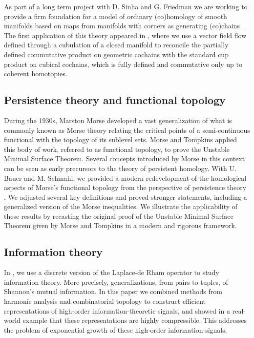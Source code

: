 As part of a long term project with D. Sinha and G. Friedman we are working to provide a firm foundation for a model of ordinary (co)homology of smooth manifolds based on maps from manifolds with corners as generating (co)chains \cite{medina2021foundations}.
The first application of this theory appeared in \cite{medina2021flowing}, where we use a vector field flow defined through a cubulation of a closed manifold to reconcile the partially defined commutative product on geometric cochains with the standard cup product on cubical cochains, which is fully defined and commutative only up to coherent homotopies.

\subsection{Persistence theory and functional topology}

During the 1930s, Marston Morse developed a vast generalization of what is commonly known as Morse theory relating the critical points of a semi-continuous functional with the topology of its sublevel sets.
Morse and Tompkins applied this body of work, referred to as functional topology, to prove the Unstable Minimal Surface Theorem.
Several concepts introduced by Morse in this context can be seen as early precursors to the theory of persistent homology.
With U. Bauer and M. Schmahl, we provided a modern redevelopment of the homological aspects of Morse's functional topology from the perspective of persistence theory \cite{medina2021functional}.
We adjusted several key definitions and proved stronger statements, including a generalized version of the Morse inequalities.
We illustrate the applicability of these results by recasting the original proof of the Unstable Minimal Surface Theorem given by Morse and Tompkins in a modern and rigorous framework.

\subsection{Information theory}

In \cite{medina2021hyperharmonic}, we use a discrete version of the Laplace-de Rham operator to study information theory.
More precisely, generalizations, from pairs to tuples, of Shannon's mutual information.
In this paper we combined methods from harmonic analysis and combinatorial topology to construct efficient representations of high-order information-theoretic signals, and showed in a real-world example that these representations are highly compressible.
This addresses the problem of exponential growth of these high-order information signals.